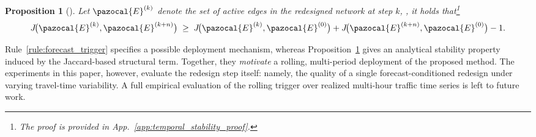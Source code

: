 \documentclass[a4paper,fleqn]{cas-sc}
\newtheorem{proposition}{Proposition}
\begin{document}
%
\begin{proposition}[]
\label{prop:temporal_stability}
Let $\pazocal{E}^{(k)}$ denote the set of active edges in the redesigned network at step $k$, , it holds that\footnote{The proof is provided in App.~\ref{app:temporal_stability_proof}.}
\[
J\!\bigl(\pazocal{E}^{(k)},\pazocal{E}^{(k+n)}\bigr) \;\ge\; J\!\bigl(\pazocal{E}^{(k)},\pazocal{E}^{(0)}\bigr) + J\!\bigl(\pazocal{E}^{(k+n)},\pazocal{E}^{(0)}\bigr) - 1.
\]
\end{proposition}
%
Rule~\ref{rule:forecast_trigger} specifies a possible deployment mechanism, whereas Proposition~\ref{prop:temporal_stability} gives an analytical stability property induced by the Jaccard-based structural term. Together, they \emph{motivate} a rolling, multi-period deployment of the proposed method. The experiments in this paper, however, evaluate the redesign step itself: namely, the quality of a single forecast-conditioned redesign under varying travel-time variability. A full empirical evaluation of the rolling trigger over realized multi-hour traffic time series is left to future work.

\end{document}
